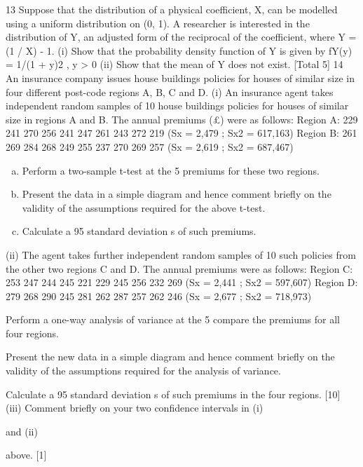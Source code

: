 \documentclass[a4paper,12pt]{article}
\begin{document}
13 Suppose that the distribution of a physical coefficient, X, can be modelled
using a uniform distribution on (0, 1). A researcher is interested in the
distribution of Y, an adjusted form of the reciprocal of the coefficient, where Y
= (1 / X) - 1.
(i) Show that the probability density function of Y is given by
fY(y) = 1/(1 + y)2 , y > 0 
(ii) Show that the mean of Y does not exist. 
[Total 5]
14 An insurance company issues house buildings policies for houses of similar
size in four different post-code regions A, B, C and D.
(i) An insurance agent takes independent random samples of 10 house
buildings policies for houses of similar size in regions A and B. The
annual premiums (£) were as follows:
Region A: 229 241 270 256 241 247 261 243 272 219
(Sx = 2,479 ; Sx2 = 617,163)
Region B: 261 269 284 268 249 255 237 270 269 257
(Sx = 2,619 ; Sx2 = 687,467)
\begin{enumerate}[(a)]
\item Perform a two-sample t-test at the 5%
premiums for these two regions.
\item Present the data in a simple diagram and hence comment briefly
on the validity of the assumptions required for the above t-test.
\item Calculate a 95%
standard deviation s of such premiums. 
\end{enumerate}
(ii) The agent takes further independent random samples of 10 such
policies from the other two regions C and D. The annual premiums
were as follows:
Region C: 253 247 244 245 221 229 245 256 232 269
(Sx = 2,441 ; Sx2 = 597,607)
Region D: 279 268 290 245 281 262 287 257 262 246
(Sx = 2,677 ; Sx2 = 718,973)
\item Perform a one-way analysis of variance at the 5%
compare the premiums for all four regions.
\item Present the new data in a simple diagram and hence comment
briefly on the validity of the assumptions required for the
analysis of variance.
\item Calculate a 95%
standard deviation s of such premiums in the four regions. [10]
(iii) Comment briefly on your two confidence intervals in (i)\item and (ii)\item
above. [1]
\end{document}
